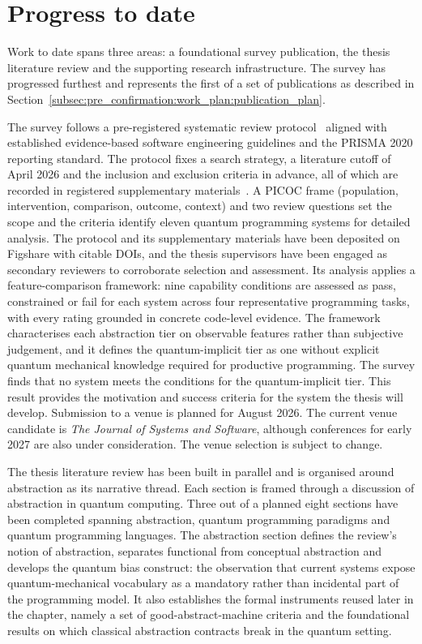 \section{Progress to date}\label{sec:pre_confirmation:progress}

Work to date spans three areas: a foundational survey publication, the thesis literature review and the supporting research infrastructure.
The survey has progressed furthest and represents the first of a set of publications as described in Section~\ref{subsec:pre_confirmation:work_plan:publication_plan}.

The survey follows a pre-registered systematic review protocol~\cite{kavadias2026qplSurveyProtocol} aligned with established evidence-based software engineering guidelines and the PRISMA 2020 reporting standard.
The protocol fixes a search strategy, a literature cutoff of April 2026 and the inclusion and exclusion criteria in advance, all of which are recorded in registered supplementary materials~\cite{kavadias2026qplSurveySupplementary}.
A PICOC frame (population, intervention, comparison, outcome, context) and two review questions set the scope and the criteria identify eleven quantum programming systems for detailed analysis.
The protocol and its supplementary materials have been deposited on Figshare with citable DOIs, and the thesis supervisors have been engaged as secondary reviewers to corroborate selection and assessment.
Its analysis applies a feature-comparison framework: nine capability conditions are assessed as pass, constrained or fail for each system across four representative programming tasks, with every rating grounded in concrete code-level evidence.
The framework characterises each abstraction tier on observable features rather than subjective judgement, and it defines the quantum-implicit tier as one without explicit quantum mechanical knowledge required for productive programming.
The survey finds that no system meets the conditions for the quantum-implicit tier.
This result provides the motivation and success criteria for the system the thesis will develop.
Submission to a venue is planned for August 2026.
The current venue candidate is \textit{The Journal of Systems and Software}, although conferences for early 2027 are also under consideration.
The venue selection is subject to change.

The thesis literature review has been built in parallel and is organised around abstraction as its narrative thread.
Each section is framed through a discussion of abstraction in quantum computing.
Three out of a planned eight sections have been completed spanning abstraction, quantum programming paradigms and quantum programming languages.
The abstraction section defines the review's notion of abstraction, separates functional from conceptual abstraction and develops the quantum bias construct: the observation that current systems expose quantum-mechanical vocabulary as a mandatory rather than incidental part of the programming model.
It also establishes the formal instruments reused later in the chapter, namely a set of good-abstract-machine criteria and the foundational results on which classical abstraction contracts break in the quantum setting.

